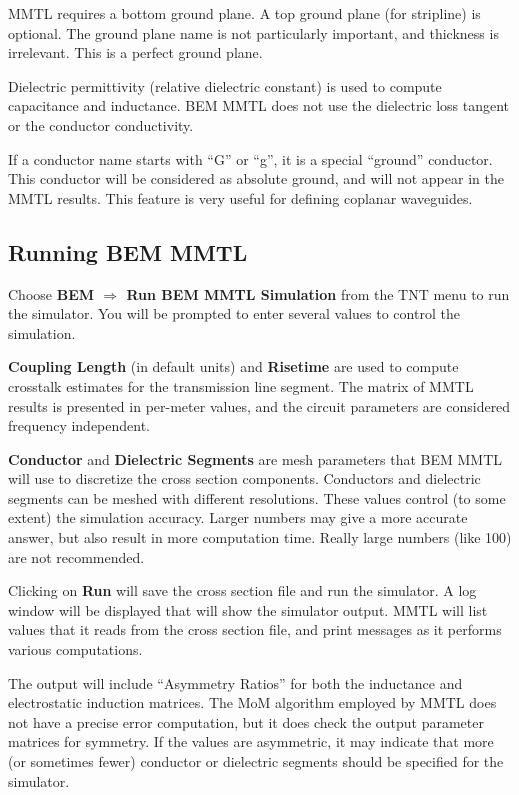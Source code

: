 \documentclass{article}
\begin{document}
MMTL requires a bottom ground plane.  A top ground plane (for
stripline) is optional.  The ground plane name is not particularly
important, and thickness is irrelevant.  This is a perfect ground
plane.

Dielectric permittivity (relative dielectric constant) is used to
compute capacitance and inductance.  BEM MMTL does not use the
dielectric loss tangent or the conductor conductivity.

If a conductor name starts with ``G'' or ``g'', it is a special
``ground'' conductor.  This conductor will be considered as absolute
ground, and will not appear in the MMTL results.  This feature is very
useful for defining coplanar waveguides.  



\subsection {Running BEM MMTL}

Choose {\bf BEM $\Rightarrow$ Run BEM MMTL Simulation} from the TNT
menu to run the simulator.  You will be prompted to enter several
values to control the simulation.

{\bf Coupling Length} (in default units) and {\bf Risetime} are used
to compute crosstalk estimates for the transmission line segment.  The
matrix of MMTL results is presented in per-meter values, and the
circuit parameters are considered frequency independent.

{\bf Conductor} and {\bf Dielectric Segments} are mesh parameters that
BEM MMTL will use to discretize the cross section components.
Conductors and dielectric segments can be meshed with different
resolutions.  These values control (to some extent) the simulation
accuracy.  Larger numbers may give a more accurate answer, but also
result in more computation time.  Really large numbers (like 100) are
not recommended.

Clicking on {\bf Run} will save the cross section file and run the
simulator.  A log window will be displayed that will show the
simulator output.  MMTL will list values that it reads from the cross
section file, and print messages as it performs various computations.

The output will include ``Asymmetry Ratios'' for both the inductance
and electrostatic induction matrices.  The MoM algorithm employed by
MMTL does not have a precise error computation, but it does check the
output parameter matrices for symmetry.  If the values are asymmetric,
it may indicate that more (or sometimes fewer) conductor or dielectric
segments should be specified for the simulator.
\end{document}
